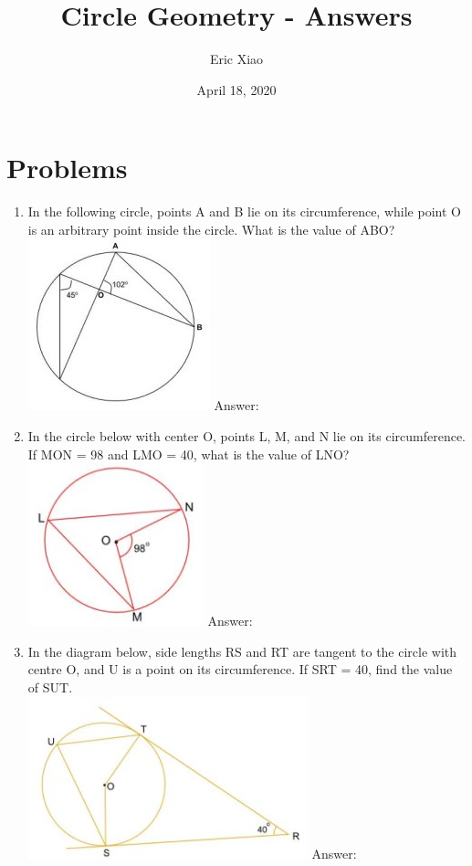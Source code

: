 \documentclass[12pt]{extarticle}
\title{Circle Geometry - Answers}
\author{Eric Xiao}
\date{April 18, 2020}
\begin{document}
\maketitle

\section{Problems}
\begin{enumerate}
    \item {In the following circle, points A and B lie on its circumference, while point O is an arbitrary point inside the circle. What is the value of \angle ABO?\\
    \includegraphics{April_18_Q1} Answer: \fbox{33\textdegree}}
    \item {In the circle below with center O, points L, M, and N lie on its circumference. If \angle MON = {98\textdegree} and \angle LMO = {40\textdegree}, what is the value of \angle LNO?\\
    \includegraphics{April_18_Q2} Answer: \fbox{9\textdegree}}
    \item {In the diagram below, side lengths RS and RT are tangent to the circle with centre O, and U is a point on its circumference. If \angle SRT = {40\textdegree}, find the value of \angle SUT.\\
    \includegraphics{April_18_Q3} Answer: \fbox{70\textdegree}}

\end{enumerate}
\end{document}
